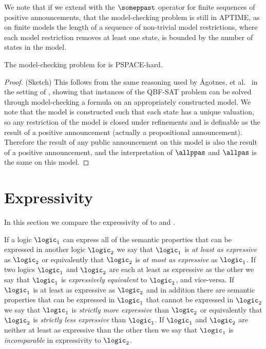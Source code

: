 We note that if we extend \logicPapalS{} with the $\someppast$ operator for finite sequences of positive announcements, that the model-checking problem is still in APTIME, as on finite models the length of a sequence of non-trivial model restrictions, where each model restriction removes at least one state, is bounded by the number of states in the model.

\begin{theorem}\label{papal-model-checking-pspace-hard}
    The model-checking problem for \logicPapalS{} is PSPACE-hard.
\end{theorem}

\begin{proof}{(Sketch)}
    This follows from the same reasoning used by Ågotnes, et al.~\cite{agotnesetal.jal:2010} in the setting of \logicApalS{}, showing that instances of the QBF-SAT problem can be solved through model-checking a \langPapal{} formula on an appropriately constructed model.
    We note that the model is constructed such that each state has a unique valuation, so any restriction of the model is closed under refinements and is definable as the result of a positive announcement (actually a propositional announcement).
    Therefore the result of any public announcement on this model is also the result of a positive announcement, and the interpretation of $\allppas$ and $\allpas$ is the same on this model.
\end{proof}

\section{Expressivity}\label{expressivity}

In this section we compare the expressivity of \logicPapalS{} to \logicPalS{} and \logicApalS{}.

If a logic $\logic_1$ can express all of the semantic properties that can be expressed in another logic $\logic_2$ we say that $\logic_1$ is {\em at least as expressive} as $\logic_2$ or equivalently that $\logic_2$ is {\em at most as expressive} as $\logic_1$.
If two logics $\logic_1$ and $\logic_2$ are each at least as expressive as the other we say that $\logic_1$ is {\em expressively equivalent} to $\logic_2$, and vice-versa.
If $\logic_1$ is at least as expressive as $\logic_2$ and in addition there are semantic properties that can be expressed in $\logic_1$ that cannot be expressed in $\logic_2$ we say that $\logic_1$ is {\em strictly more expressive} than $\logic_2$ or equivalently that $\logic_2$ is {\em strictly less expressive} than $\logic_1$.
If $\logic_1$ and $\logic_2$ are neither at least as expressive than the other then we say that $\logic_1$ is {\em incomparable} in expressivity to $\logic_2$.

